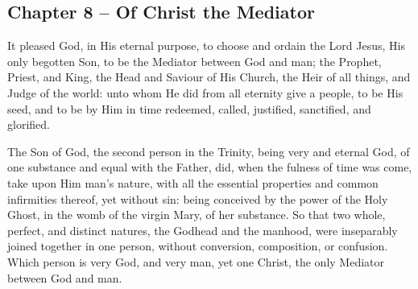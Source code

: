 \begin{outerlst}[left=0pt,labelsep=0pt]
\item
{}
\section{Chapter 8 -- Of Christ the Mediator}
\begin{innerlst}[resume*]

\item It pleased God, in His eternal purpose, to choose and ordain the Lord Jesus, His only begotten Son, to be the Mediator between God and man; the Prophet, Priest, and King, the Head and Saviour of His Church, the Heir of all things, and Judge of the world: unto whom He did from all eternity give a people, to be His seed, and to be by Him in time redeemed, called, justified, sanctified, and glorified.   

\item The Son of God, the second person in the Trinity, being very and eternal God, of one substance and equal with the Father, did, when the fulness of time was come, take upon Him man's nature, with all the essential properties and common infirmities thereof, yet without sin: being conceived by the power of the Holy Ghost, in the womb of the virgin Mary, of her substance. So that two whole, perfect, and distinct natures, the Godhead and the manhood, were inseparably joined together in one person, without conversion, composition, or confusion. Which person is very God, and very man, yet one Christ, the only Mediator between God and man.   


\end{innerlst}
\end{outerlst}
